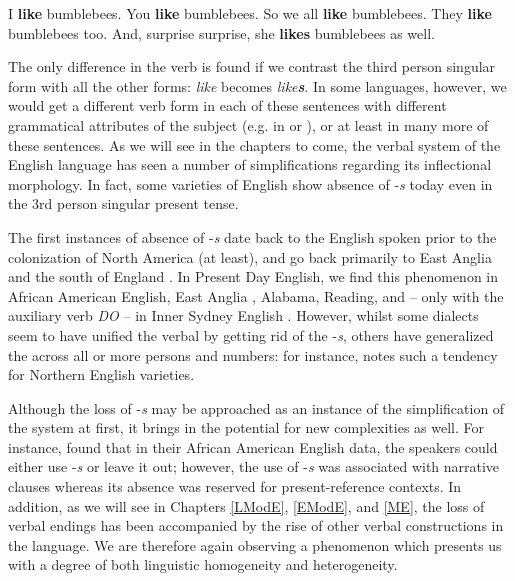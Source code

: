 \begin{exe}
    \ex I \textbf{like} bumblebees.
    \ex You \textbf{like} bumblebees.
    \ex So we all \textbf{like} bumblebees.
    \ex They \textbf{like} bumblebees too.
    \ex And, surprise surprise, she \textbf{likes} bumblebees as well.
\end{exe}

\noindent The only difference in the verb is found if we contrast the third person singular form with all the other forms: \emph{like} becomes \emph{like\textbf{s}}. In some languages, however, we would get a different verb form in each of these sentences with different grammatical attributes of the subject (e.g. in  or ), or at least in many more of these sentences. As we will see in the chapters to come, the verbal system of the English language has seen a number of simplifications regarding its inflectional morphology. In fact, some varieties of English show absence of -\emph{s} today even in the 3rd person singular present tense.

The first instances of absence of -\emph{s} date back to the English spoken prior to the colonization of North America (at least), and go back primarily to East Anglia and the south of England \citep[102]{Schneider1983}. In Present Day English, we find this phenomenon in African American English, East Anglia \citep{Schneider1983}, Alabama, Reading, and -- only with the auxiliary verb \emph{DO} -- in Inner Sydney English \citep[236--7]{Eisikovits1996}. However, whilst some dialects seem to have unified the verbal  by getting rid of the -\emph{s}, others have generalized the  across all or more persons and numbers: for instance, \citet[102]{Schneider1983} notes such a tendency for Northern English varieties.

Although the loss of -\emph{s} may be approached as an instance of the simplification of the system at first, it brings in the potential for new complexities as well. For instance, \citet[27]{MyhillHarris1986} found that in their African American English data, the speakers could either use -\emph{s} or leave it out; however, the use of -\emph{s} was associated with narrative clauses whereas its absence was reserved for present-reference contexts. In addition, as we will see in Chapters \ref{LModE}, \ref{EModE}, and \ref{ME}, the loss of verbal endings has been accompanied by the rise of other verbal constructions in the language. We are therefore again observing a phenomenon which presents us with a degree of both linguistic homogeneity and heterogeneity.


